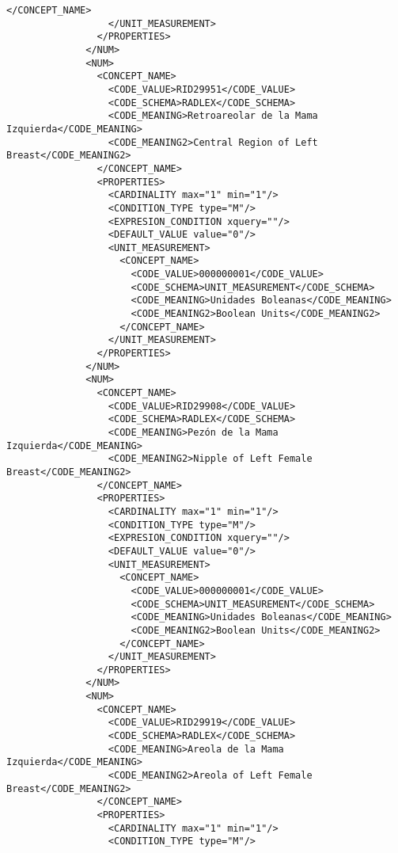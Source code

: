 \begin{lstlisting}[label=some-code,caption=Some Code]
                    </CONCEPT_NAME>
                  </UNIT_MEASUREMENT>
                </PROPERTIES>
              </NUM>
              <NUM>
                <CONCEPT_NAME>
                  <CODE_VALUE>RID29951</CODE_VALUE>
                  <CODE_SCHEMA>RADLEX</CODE_SCHEMA>
                  <CODE_MEANING>Retroareolar de la Mama Izquierda</CODE_MEANING>
                  <CODE_MEANING2>Central Region of Left Breast</CODE_MEANING2>
                </CONCEPT_NAME>
                <PROPERTIES>
                  <CARDINALITY max="1" min="1"/>
                  <CONDITION_TYPE type="M"/>
                  <EXPRESION_CONDITION xquery=""/>
                  <DEFAULT_VALUE value="0"/>
                  <UNIT_MEASUREMENT>
                    <CONCEPT_NAME>
                      <CODE_VALUE>000000001</CODE_VALUE>
                      <CODE_SCHEMA>UNIT_MEASUREMENT</CODE_SCHEMA>
                      <CODE_MEANING>Unidades Boleanas</CODE_MEANING>
                      <CODE_MEANING2>Boolean Units</CODE_MEANING2>
                    </CONCEPT_NAME>
                  </UNIT_MEASUREMENT>
                </PROPERTIES>
              </NUM>
              <NUM>
                <CONCEPT_NAME>
                  <CODE_VALUE>RID29908</CODE_VALUE>
                  <CODE_SCHEMA>RADLEX</CODE_SCHEMA>
                  <CODE_MEANING>Pezón de la Mama Izquierda</CODE_MEANING>
                  <CODE_MEANING2>Nipple of Left Female Breast</CODE_MEANING2>
                </CONCEPT_NAME>
                <PROPERTIES>
                  <CARDINALITY max="1" min="1"/>
                  <CONDITION_TYPE type="M"/>
                  <EXPRESION_CONDITION xquery=""/>
                  <DEFAULT_VALUE value="0"/>
                  <UNIT_MEASUREMENT>
                    <CONCEPT_NAME>
                      <CODE_VALUE>000000001</CODE_VALUE>
                      <CODE_SCHEMA>UNIT_MEASUREMENT</CODE_SCHEMA>
                      <CODE_MEANING>Unidades Boleanas</CODE_MEANING>
                      <CODE_MEANING2>Boolean Units</CODE_MEANING2>
                    </CONCEPT_NAME>
                  </UNIT_MEASUREMENT>
                </PROPERTIES>
              </NUM>
              <NUM>
                <CONCEPT_NAME>
                  <CODE_VALUE>RID29919</CODE_VALUE>
                  <CODE_SCHEMA>RADLEX</CODE_SCHEMA>
                  <CODE_MEANING>Areola de la Mama Izquierda</CODE_MEANING>
                  <CODE_MEANING2>Areola of Left Female Breast</CODE_MEANING2>
                </CONCEPT_NAME>
                <PROPERTIES>
                  <CARDINALITY max="1" min="1"/>
                  <CONDITION_TYPE type="M"/>

\end{lstlisting}
